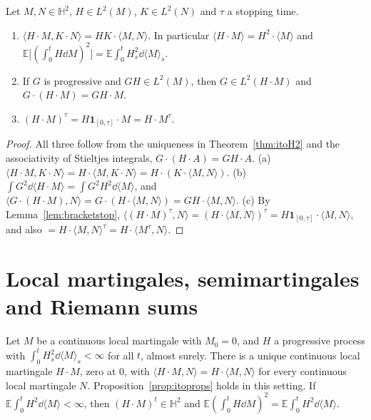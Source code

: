 \begin{proposition}\label{prop:itoprops}
Let $M,N\in\mathbb H^2$, $H\in L^2(M)$, $K\in L^2(N)$ and $\tau$ a stopping time.
\begin{enumerate}[label=(\alph*)]
\item $\langle H\cdot M,K\cdot N\rangle=HK\cdot\langle M,N\rangle$. In particular $\langle H\cdot M\rangle=H^2\cdot\langle M\rangle$ and $\mathbb E\bigl[(\int_0^tH\dd M)^2\bigr]=\mathbb E\int_0^tH_s^2\dd\langle M\rangle_s$.
\item If $G$ is progressive and $GH\in L^2(M)$, then $G\in L^2(H\cdot M)$ and $G\cdot(H\cdot M)=GH\cdot M$.
\item $(H\cdot M)^\tau=H\mathbf 1_{[0,\tau]}\cdot M=H\cdot M^\tau$.
\end{enumerate}
\end{proposition}

\begin{proof}
All three follow from the uniqueness in Theorem~\ref{thm:itoH2} and the associativity of Stieltjes integrals, $G\cdot(H\cdot A)=GH\cdot A$. (a) $\langle H\cdot M,K\cdot N\rangle=H\cdot\langle M,K\cdot N\rangle=H\cdot(K\cdot\langle M,N\rangle)$.
(b) $\int G^2\dd\langle H\cdot M\rangle=\int G^2H^2\dd\langle M\rangle$, and $\langle G\cdot(H\cdot M),N\rangle=G\cdot(H\cdot\langle M,N\rangle)=GH\cdot\langle M,N\rangle$. (c) By Lemma~\ref{lem:bracketstop},
$\langle(H\cdot M)^\tau,N\rangle=(H\cdot\langle M,N\rangle)^\tau=H\mathbf 1_{[0,\tau]}\cdot\langle M,N\rangle$, and also $=H\cdot\langle M,N\rangle^\tau=H\cdot\langle M^\tau,N\rangle$.
\end{proof}

\section{Local martingales, semimartingales and Riemann sums}

\begin{theorem}\label{thm:itoloc}
Let $M$ be a continuous local martingale with $M_0=0$, and $H$ a progressive process with $\int_0^tH_s^2\dd\langle M\rangle_s<\infty$ for all $t$, almost surely. There is a unique continuous local martingale
$H\cdot M$, zero at $0$, with $\langle H\cdot M,N\rangle=H\cdot\langle M,N\rangle$ for every continuous local martingale $N$. Proposition~\ref{prop:itoprops} holds in this setting. If
$\mathbb E\int_0^tH^2\dd\langle M\rangle<\infty$, then $(H\cdot M)^t\in\mathbb H^2$ and $\mathbb E(\int_0^tH\dd M)^2=\mathbb E\int_0^tH^2\dd\langle M\rangle$.
\end{theorem}

